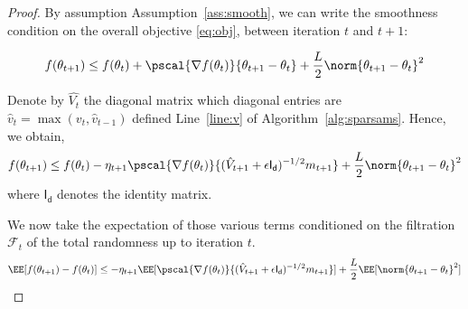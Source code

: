 \documentclass[11pt]{article}
\begin{document}
\begin{proof}






By assumption Assumption~\ref{ass:smooth}, we can write the smoothness condition on the overall objective \eqref{eq:obj}, between iteration $t$ and $t+1$:

\begin{equation}
f(\theta_{t+1}) \leq f(\theta_{t})+  \pscal{\nabla f(\theta_t)}{\theta_{t+1} - \theta_{t}} + \frac{L}{2} \norm{\theta_{t+1} - \theta_{t}}^2
\end{equation}

Denote by $\hat{V_t}$ the diagonal matrix which diagonal entries are $\hat v_t=\max(v_t,\hat v_{t-1})$ defined Line~\ref{line:v} of Algorithm~\ref{alg:sparsams}.
Hence, we obtain,
\begin{equation}
f(\theta_{t+1}) \leq f(\theta_{t}) - \eta_{t+1} \pscal{\nabla f(\theta_t)}{(\hat{V}_{t+1} + \epsilon \mathsf{I_d})^{-1/2} m_{t+1}} + \frac{L}{2} \norm{\theta_{t+1} - \theta_{t}}^2
\end{equation}
where $\mathsf{I_d}$ denotes the identity matrix.

We now take the expectation of those various terms conditioned on the filtration $\mathcal{F}_t$ of the total randomness up to iteration $t$.
\begin{equation}\label{eq:smooth1}
\EE[f(\theta_{t+1}) - f(\theta_{t}) ] \leq - \eta_{t+1} \EE[\pscal{\nabla f(\theta_t)}{(\hat{V}_{t+1} + \epsilon \mathsf{I_d})^{-1/2} m_{t+1}}] + \frac{L}{2} \EE[\norm{\theta_{t+1} - \theta_{t}}^2]
\end{equation}


\end{proof}
\end{document}
